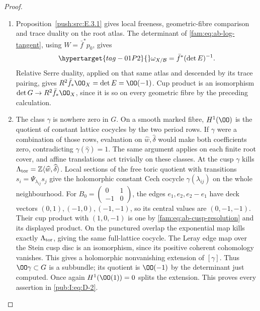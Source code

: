 \begin{proof}
\begin{enumerate}[label=\arabic*.,leftmargin=*]
\item Proposition~\ref{push:src:E.3.1} gives local freeness,
geometric-fibre comparison and trace duality on the root atlas.
The determinant of \eqref{fam:eq:ab-log-tangent}, using $W=\bar f^*p_0$, gives
\begin{equation}
 \hypertarget{tag-01P2}{}\label{fam:eq:ab-relative-dualizing}
\omega_{X/\mathcal B}=\bar f^*(\det E)^{-1}.
\end{equation}
Relative Serre duality, applied on that same atlas and descended by
its trace pairing, gives $R^2\bar f_*\OO_X=\det E=\OO(-1)$.
Cup product is an isomorphism $\det G\to R^2\bar f_*\OO_X$, since it
is so on every geometric fibre by the preceding calculation.

\item The class $\gamma$ is nowhere zero in $G$. On a smooth marked fibre,
$H^1(\OO)$ is the quotient of constant lattice cocycles by the two
period rows. If $\gamma$ were a combination of those rows, evaluation
on $\widehat w,\widehat\delta$ would make both coefficients zero,
contradicting $\gamma(\widehat\gamma)=1$. The same argument applies
on each finite root cover, and affine translations act trivially on
these classes. At the cusp $\gamma$ kills
$\Lambda_{\rm tor}=\mathbb Z\langle\widehat w,\widehat\delta\rangle$.
Local sections of the free toric quotient with transitions
$s_i=\Psi_{\lambda_{ij}}s_j$ give the holomorphic constant Cech
cocycle $\gamma(\lambda_{ij})$ on the whole neighbourhood.
For $B_0=\left(\begin{smallmatrix}0&1\\-1&0\end{smallmatrix}\right)$,
the edges $e_1,e_2,e_2-e_1$ have deck vectors
$(0,1),(-1,0),(-1,-1)$, so its central values are $(0,-1,-1)$.
Their cup product with $(1,0,-1)$ is one by
\eqref{fam:eq:ab-cusp-resolution} and its displayed product.
On the punctured overlap the exponential map kills exactly
$\Lambda_{\rm tor}$, giving the same full-lattice cocycle.
The Leray edge map over the Stein cusp disc is an isomorphism,
since its positive coherent cohomology vanishes. This gives
a holomorphic nonvanishing extension of $[\gamma]$.
Thus
$\OO\gamma\subset G$ is a subbundle; its quotient is $\OO(-1)$ by
the determinant just computed. Once again $H^1(\OO(1))=0$ splits the
extension. This proves every assertion in \eqref{pub:I:eq:D-2}.
\end{enumerate}
\end{proof}